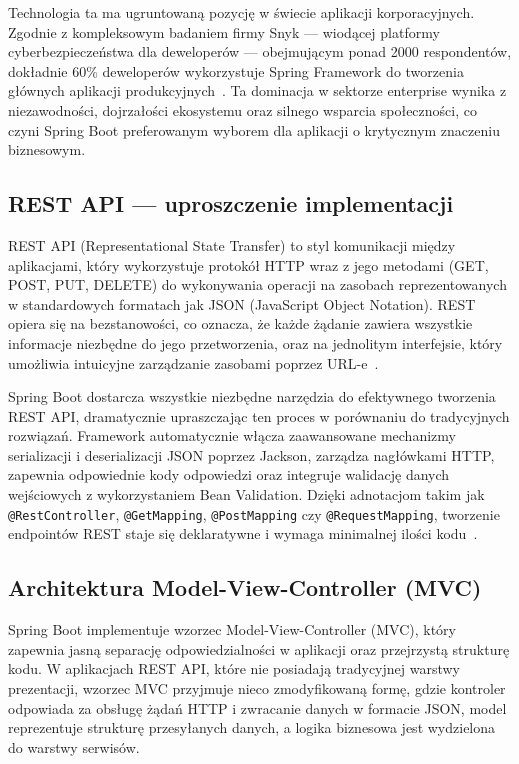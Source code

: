 \documentclass[a4paper,12pt,openany]{book}
\begin{document}
Technologia ta ma ugruntowaną pozycję w świecie aplikacji korporacyjnych. Zgodnie z kompleksowym badaniem firmy Snyk — wiodącej platformy cyberbezpieczeństwa dla deweloperów — obejmującym ponad 2000 respondentów, dokładnie 60\% deweloperów wykorzystuje Spring Framework do tworzenia głównych aplikacji produkcyjnych~\cite{bib:snyk2020}. Ta dominacja w sektorze enterprise wynika z niezawodności, dojrzałości ekosystemu oraz silnego wsparcia społeczności, co czyni Spring Boot preferowanym wyborem dla aplikacji o krytycznym znaczeniu biznesowym.

\subsection*{REST API --- uproszczenie implementacji}

REST API (Representational State Transfer) to styl komunikacji między aplikacjami, który wykorzystuje protokół HTTP wraz z jego metodami (GET, POST, PUT, DELETE) do wykonywania operacji na zasobach reprezentowanych w standardowych formatach jak JSON (JavaScript Object Notation). REST opiera się na bezstanowości, co oznacza, że każde żądanie zawiera wszystkie informacje niezbędne do jego przetworzenia, oraz na jednolitym interfejsie, który umożliwia intuicyjne zarządzanie zasobami poprzez URL-e~\cite{bib:ibm2024}.

Spring Boot dostarcza wszystkie niezbędne narzędzia do efektywnego tworzenia REST API, dramatycznie upraszczając ten proces w porównaniu do tradycyjnych rozwiązań. Framework automatycznie włącza zaawansowane mechanizmy serializacji i deserializacji JSON poprzez Jackson, zarządza nagłówkami HTTP, zapewnia odpowiednie kody odpowiedzi oraz integruje walidację danych wejściowych z wykorzystaniem Bean Validation. Dzięki adnotacjom takim jak \texttt{@RestController}, \texttt{@GetMapping}, \texttt{@PostMapping} czy \texttt{@RequestMapping}, tworzenie endpointów REST staje się deklaratywne i wymaga minimalnej ilości kodu~\cite{bib:baeldung2023rest}.

\subsection*{Architektura Model-View-Controller (MVC)}

Spring Boot implementuje wzorzec Model-View-Controller (MVC), który zapewnia jasną separację odpowiedzialności w aplikacji oraz przejrzystą strukturę kodu. W aplikacjach REST API, które nie posiadają tradycyjnej warstwy prezentacji, wzorzec MVC przyjmuje nieco zmodyfikowaną formę, gdzie kontroler odpowiada za obsługę żądań HTTP i zwracanie danych w formacie JSON, model reprezentuje strukturę przesyłanych danych, a logika biznesowa jest wydzielona do warstwy serwisów.
\end{document}
